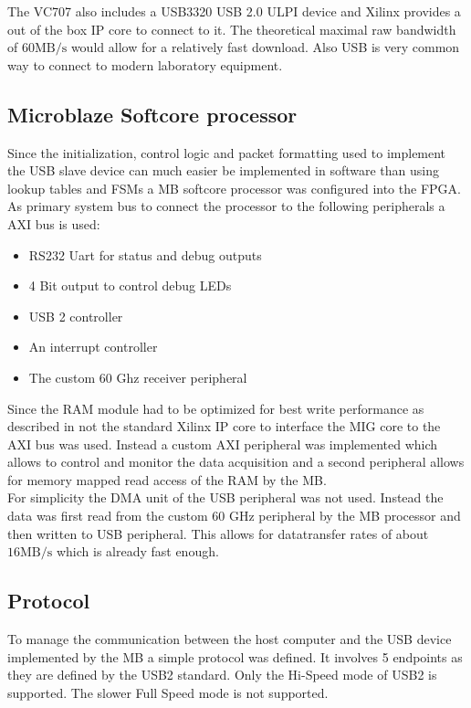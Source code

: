 The VC707 also includes a USB3320 USB 2.0 ULPI device and Xilinx provides
a out of the box \gls{IP} core to connect to it. The theoretical maximal
raw bandwidth of $60 \text{MB}/\text{s}$ would allow for a relatively fast
download. Also \gls{USB} is very common way to connect to modern laboratory
equipment.

\subsection{Microblaze Softcore processor}
Since the initialization, control logic and packet formatting
used to implement the \gls{USB} slave device can much easier be implemented
in software than using lookup tables and \glspl{FSM} a
\gls{MB} softcore processor was configured into the \gls{FPGA}. \\

As primary system bus to connect the processor to the following peripherals
a \gls{AXI} bus is used:
\begin{itemize}
\item RS232 Uart for status and debug outputs
\item 4 Bit output to control debug \glspl{LED}
\item USB 2 controller
\item An interrupt controller
\item The custom 60 Ghz receiver peripheral
\end{itemize}

Since the \gls{RAM} module had to be optimized for best write performance
as described in  not the standard Xilinx \gls{IP}
core to interface the \gls{MIG} core to the \gls{AXI} bus was used.
Instead a custom \gls{AXI} peripheral was implemented which allows to
control and monitor the data acquisition and a second peripheral allows
for memory mapped read access of the \gls{RAM} by the \gls{MB}. \\

For simplicity the \gls{DMA} unit of the \gls{USB} peripheral was not used.
Instead the data was first read from the custom 60 GHz peripheral
by the \gls{MB} processor and then written to \gls{USB} peripheral.
This allows for datatransfer rates of about $16 \text{MB} / \text{s}$
which is already fast enough. \\

\subsection{Protocol}
To manage the communication between the host computer and the \gls{USB} device
implemented by the \gls{MB} a simple protocol was defined.
It involves 5 endpoints as they are defined by the \gls{USB}2 standard.
Only the Hi-Speed mode of \gls{USB}2 is supported. The slower Full Speed mode
is not supported. \\

